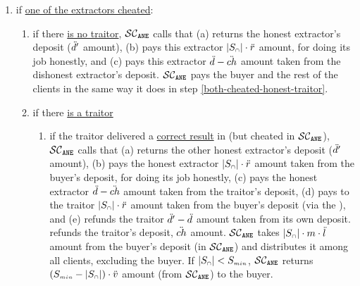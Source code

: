 \begin{itemize}
\begin{enumerate}
\begin{enumerate}[leftmargin=2mm]
\begin{enumerate}
%
\end{enumerate}
\end{enumerate}
%
\item if \underline{one of the extractors cheated}: 
%
\begin{enumerate}[leftmargin=2mm]
%
\item if there \underline{is no traitor},  $\mathcal{SC}_{\mathtt{ANE}}$ calls \SCpc that (a) returns the honest extractor's deposit ($\ddot{d}'$ amount), (b) pays this extractor $|S_{\scriptscriptstyle\cap}|\cdot \ddot{r}$ amount, for doing its job honestly, and (c) pays this extractor $ \ddot{d}-\ddot{ch}$ amount taken from the dishonest extractor's deposit. 
%
%
%
 $\mathcal{SC}_{\mathtt{ANE}}$ pays the buyer and the rest of the clients in the same way it does in step \ref{both-cheated-honest-traitor}. 


%
\item if there \underline{is a traitor}
%


\begin{enumerate}
%
\item\label{one-cheated-exists-traitor-honest-traitor}  if the traitor delivered a \underline{correct result} in \SCtc (but  cheated in $\mathcal{SC}_{\mathtt{ANE}}$),  $\mathcal{SC}_{\mathtt{ANE}}$ calls \SCpc that (a) returns the other honest extractor's deposit ($\ddot{d}'$ amount), (b) pays the honest extractor $|S_{\scriptscriptstyle\cap}|\cdot \ddot{r}$ amount taken from the buyer's deposit, for doing its job honestly,  (c) pays the honest extractor $\ddot{d}- \ddot{ch}$ amount taken from the traitor's deposit,  
%
%
 (d)
 pays to the traitor $|S_{\scriptscriptstyle\cap}|\cdot \ddot{r}$ amount taken from the buyer’s deposit (via the \SCtc), and (e) refunds the traitor $\ddot{d}'-\ddot{d}$ amount taken from its own deposit.  \SCtc refunds the traitor's deposit, $\ddot{ch}$ amount.  $\mathcal{SC}_{\mathtt{ANE}}$ takes $|S_{\scriptscriptstyle\cap}|\cdot m\cdot \ddot{l}$ amount from the buyer's deposit (in $\mathcal{SC}_{\mathtt{ANE}}$) and distributes it among all clients, excluding the buyer. If $|{ { {S}}}_{\scriptscriptstyle\cap}|<S_{\scriptscriptstyle min}$,   $\mathcal{SC}_{\mathtt{ANE}}$ returns $(S_{\scriptscriptstyle min}-|{ { {S}}}_{\scriptscriptstyle\cap}|)\cdot \ddot{v}$ amount (from $\mathcal{SC}_{\mathtt{ANE}}$)  to the buyer. 
 

\end{enumerate}
\end{enumerate}
\end{enumerate}
\end{itemize}
